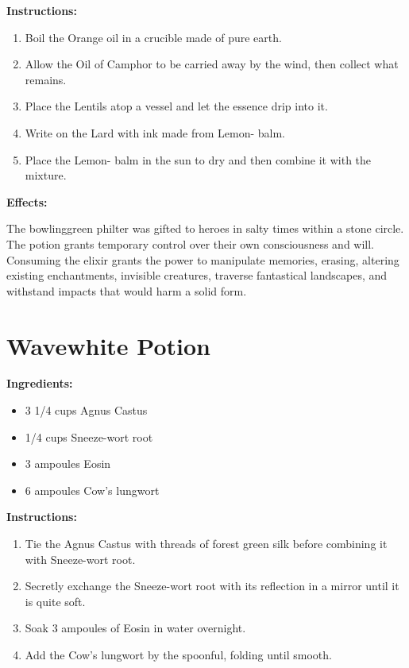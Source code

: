 \documentclass{article}
\begin{document}
\textbf{Instructions:}

\begin{enumerate}
  \item Boil the Orange oil in a crucible made of pure earth.
  \item Allow the Oil of Camphor to be carried away by the wind, then collect what remains.
  \item Place the Lentils atop a vessel and let the essence drip into it.
  \item Write on the Lard with ink made from Lemon- balm.
  \item Place the Lemon- balm in the sun to dry and then combine it with the mixture.
\end{enumerate}

\textbf{Effects:}

The bowlinggreen philter was gifted to heroes in salty times within a stone circle. The potion grants temporary control over their own consciousness and will. Consuming the elixir grants the power to manipulate memories, erasing, altering existing enchantments, invisible creatures, traverse fantastical landscapes, and withstand impacts that would harm a solid form.

\newpage
\section*{Wavewhite Potion}

\textbf{Ingredients:}

\begin{itemize}
  \item 3 1/4 cups Agnus Castus
  \item 1/4 cups Sneeze-wort root
  \item 3 ampoules Eosin
  \item 6 ampoules Cow's lungwort
\end{itemize}

\textbf{Instructions:}

\begin{enumerate}
  \item Tie the Agnus Castus with threads of forest green silk before combining it with Sneeze-wort root.
  \item Secretly exchange the Sneeze-wort root with its reflection in a mirror until it is quite soft.
  \item Soak 3 ampoules of Eosin in water overnight.
  \item Add the Cow's lungwort by the spoonful, folding until smooth.
\end{enumerate}
\end{document}
